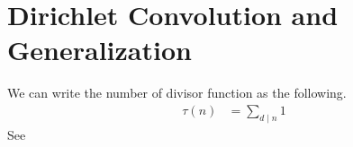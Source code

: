 \documentclass[]{subfile}
\begin{document}
    \chapter{Dirichlet Convolution and Generalization}
    We can write the number of divisor function as the following.
        \begin{align*}
            \tau(n)
                & = \sum_{d\mid n}1
        \end{align*}
    See \textcite{apostol_1976}
\end{document}
